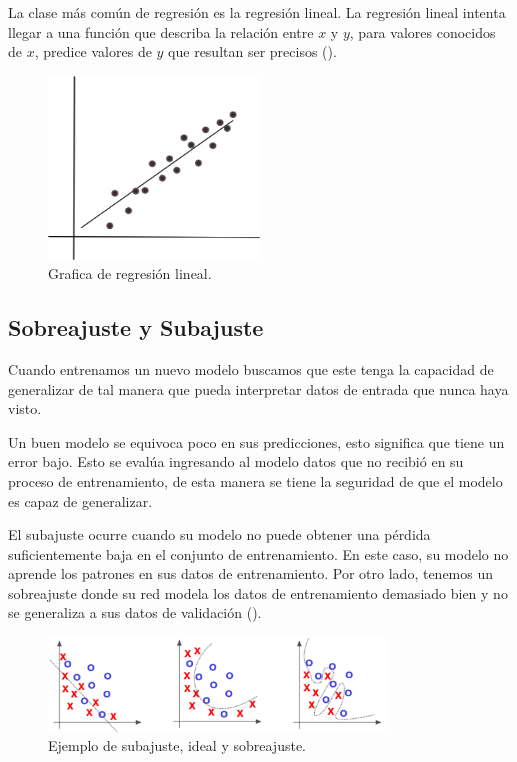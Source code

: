 La clase más común de regresión es la regresión lineal. La regresión lineal intenta llegar a una función que describa la relación entre $x$ y $y$, para valores conocidos de $x$, predice valores de $y$ que resultan ser precisos (\cite{patterson2017deep}).

\begin{figure}[H]
    \centering
    \includegraphics[width=0.5\textwidth]{MarcoTeorico/imgs/RegresionLineal.png}
    \caption{Grafica de regresión lineal.}
    \label{fig:regresionLineal}
\end{figure}

\subsection{Sobreajuste y Subajuste}

Cuando entrenamos un nuevo modelo buscamos que este tenga la capacidad de generalizar de tal manera que pueda interpretar datos de entrada que nunca haya visto.

Un buen modelo se equivoca poco en sus predicciones, esto significa que tiene un error bajo. Esto se evalúa ingresando al modelo datos que no recibió en su proceso de entrenamiento, de esta manera se tiene la seguridad de que el modelo es capaz de generalizar.

El subajuste ocurre cuando su modelo no puede obtener una pérdida suficientemente baja en el conjunto de entrenamiento. En este caso, su modelo no aprende los patrones en sus datos de entrenamiento. Por otro lado, tenemos un sobreajuste donde su red modela los datos de entrenamiento demasiado bien y no se generaliza a sus datos de validación (\cite{rosebrock2017deep}).


\begin{figure}[H]
    \centering
    \includegraphics[width=0.8\textwidth]{MarcoTeorico/imgs/under-overfitting.png}
    \caption{Ejemplo de subajuste, ideal y sobreajuste.}
    \label{fig:underOverFtting}
\end{figure}

